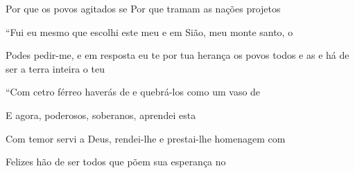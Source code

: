 \begin{greenumerate}
  \item {}Por que os povos agitados se  Por que tramam as nações projetos 

  \item {}``Fui eu mesmo que escolhi este meu  e em Sião, meu monte santo, o 

  \item {}Podes pedir-me, e em resposta eu te  por tua herança os povos todos e as  e há de ser a terra inteira o teu 

  \item {}``Com cetro férreo haverás de  e quebrá-los como um vaso de 

  \item {}E agora, poderosos,  soberanos, aprendei esta 

  \item {}Com temor servi a Deus, rendei-lhe  e prestai-lhe homenagem com 

  \item {}Felizes hão de ser todos  que põem sua esperança no 
\end{greenumerate}